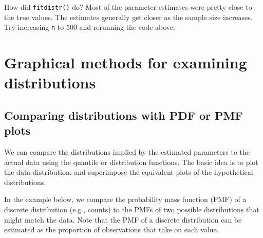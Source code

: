 \documentclass[
  13,
  letterpaper,
]{report}
\begin{document}
How did \texttt{fitdistr()} do? Most of the parameter estimates were
pretty close to the true values. The estimates generally get closer as
the sample size increases. Try increasing \texttt{n} to 500 and
rerunning the code above.

\section{Graphical methods for examining
distributions}\label{sec-dtest-fit-graph}

\subsection{Comparing distributions with PDF or PMF
plots}\label{sec-dtest-fit-pdf}

We can compare the distributions implied by the estimated parameters to
the actual data using the quantile or distribution functions. The basic
idea is to plot the data distribution, and superimpose the equivalent
plots of the hypothetical distributions.

In the example below, we compare the probability mass function (PMF) of
a discrete distribution (e.g., counts) to the PMFs of two possible
distributions that might match the data. Note that the PMF of a discrete
distribution can be estimated as the proportion of observations that
take on each value.
\end{document}

